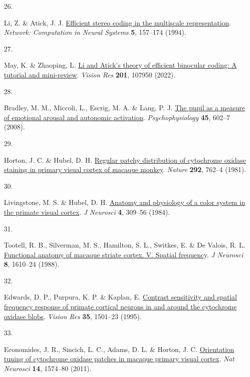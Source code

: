 \documentclass[
]{article}
\newlength{\cslhangindent}
\newlength{\csllabelwidth}
\newlength{\cslentryspacingunit} %
\newenvironment{CSLReferences}[2] %
 {%
  \setlength{\parindent}{0pt}
  \ifodd #1
  \let\oldpar\par
  \def\par{\hangindent=\cslhangindent\oldpar}
  \fi
  \setlength{\parskip}{#2\cslentryspacingunit}
 }%
 {}
\newcommand{\CSLLeftMargin}[1]{\parbox[t]{\csllabelwidth}{#1}}
\newcommand{\CSLRightInline}[1]{\parbox[t]{\linewidth - \csllabelwidth}{#1}\break}
\begin{document}
\begin{CSLReferences}{0}{0}
\leavevmode{}%
\CSLLeftMargin{26. }%
\CSLRightInline{Li, Z. \& Atick, J. J. \href{https://doi.org/10.1088/0954-898X_5_2_003}{Efficient stereo coding in the multiscale representation}. \emph{Network: Computation in Neural Systems} \textbf{5}, 157--174 (1994).}

\leavevmode{}%
\CSLLeftMargin{27. }%
\CSLRightInline{May, K. \& Zhaoping, L. \href{https://doi.org/10.1016/j.visres.2021.08.005}{Li and {Atick's} theory of efficient binocular coding: A tutorial and mini-review}. \emph{Vision Res} \textbf{201}, 107950 (2022).}

\leavevmode{}%
\CSLLeftMargin{28. }%
\CSLRightInline{Bradley, M. M., Miccoli, L., Escrig, M. A. \& Lang, P. J. \href{https://doi.org/10.1111/j.1469-8986.2008.00654.x}{The pupil as a measure of emotional arousal and autonomic activation}. \emph{Psychophysiology} \textbf{45}, 602--7 (2008).}

\leavevmode{}%
\CSLLeftMargin{29. }%
\CSLRightInline{Horton, J. C. \& Hubel, D. H. \href{https://doi.org/10.1038/292762a0}{Regular patchy distribution of cytochrome oxidase staining in primary visual cortex of macaque monkey}. \emph{Nature} \textbf{292}, 762--4 (1981).}

\leavevmode{}%
\CSLLeftMargin{30. }%
\CSLRightInline{Livingstone, M. S. \& Hubel, D. H. \href{https://doi.org/10.1523/JNEUROSCI.04-01-00309.1984}{Anatomy and physiology of a color system in the primate visual cortex}. \emph{J Neurosci} \textbf{4}, 309--56 (1984).}

\leavevmode{}%
\CSLLeftMargin{31. }%
\CSLRightInline{Tootell, R. B., Silverman, M. S., Hamilton, S. L., Switkes, E. \& De Valois, R. L. \href{https://doi.org/10.1523/JNEUROSCI.08-05-01610.1988}{Functional anatomy of macaque striate cortex. V. Spatial frequency}. \emph{J Neurosci} \textbf{8}, 1610--24 (1988).}

\leavevmode{}%
\CSLLeftMargin{32. }%
\CSLRightInline{Edwards, D. P., Purpura, K. P. \& Kaplan, E. \href{https://doi.org/10.1016/0042-6989(94)00253-i}{Contrast sensitivity and spatial frequency response of primate cortical neurons in and around the cytochrome oxidase blobs}. \emph{Vision Res} \textbf{35}, 1501--23 (1995).}

\leavevmode{}%
\CSLLeftMargin{33. }%
\CSLRightInline{Economides, J. R., Sincich, L. C., Adams, D. L. \& Horton, J. C. \href{https://doi.org/10.1038/nn.2958}{Orientation tuning of cytochrome oxidase patches in macaque primary visual cortex}. \emph{Nat Neurosci} \textbf{14}, 1574--80 (2011).}


\end{CSLReferences}
\end{document}
